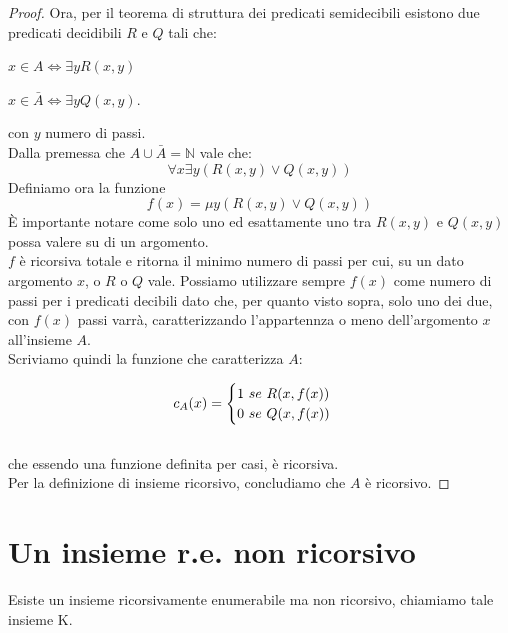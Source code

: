\begin{proof}
Ora, per il teorema di struttura dei predicati semidecibili esistono due predicati decidibili $R$ e $Q$ tali che:
\begin{center}
$x\in{A}\Leftrightarrow \exists y R(x,y)$\\\end{center}
\begin{center}
$x\in{\bar{A}}\Leftrightarrow \exists y Q(x,y).$\\\end{center}
con $y$ numero di passi.\\
Dalla premessa che $A\cup\bar{A} = \mathbb{N}$ vale che:\\
\[
\forall x \exists y (R(x,y) \vee Q(x,y))
\]
Definiamo ora la funzione
\[
f(x)=\mu y(R(x,y) \vee Q(x,y))
\]
\`{E} importante notare come solo uno ed esattamente uno tra $R(x,y)$ e $Q(x,y)$ possa valere su di un argomento.\\
$f$ \`{e} ricorsiva totale e ritorna il minimo numero di passi per cui, su un dato argomento $x$, o $R$ o $Q$ vale. Possiamo utilizzare sempre $f(x)$ come numero di passi per i predicati decibili dato che, per quanto visto sopra, solo uno dei due, con $f(x)$ passi varr\`{a}, caratterizzando l'appartennza o meno dell'argomento $x$ all'insieme $A$.\\
Scriviamo quindi la funzione che caratterizza $A$:

$$
c_{A}(x)=\begin{cases}
1\ se\ R(x,f(x))\cr
0\ se\ Q(x,f(x))\end{cases}
$$\\
che essendo una funzione definita per casi, \`{e} ricorsiva.\\
Per la definizione di insieme ricorsivo, concludiamo che $A$ \`{e} ricorsivo.
\end{proof} 


\section{Un insieme r.e. non ricorsivo}

\begin{thm}
  Esiste un insieme ricorsivamente enumerabile ma non ricorsivo, chiamiamo tale insieme K.
\end{thm}

